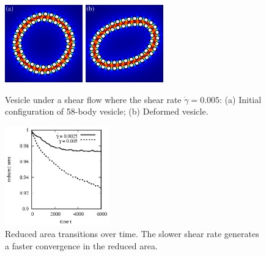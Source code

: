 \documentclass[lineno]{jfm}
\begin{document}
\begin{figure}[H]
\begin{center}
\includegraphics[width=0.3\textwidth]{N58_0.eps}
\includegraphics[width=0.3\textwidth]{N58_20000.eps}
\end{center}
  \caption{Vesicle under a shear flow where the shear rate $\dot\gamma=0.005$: 
  (a) Initial configuration of 58-body vesicle; (b) Deformed vesicle.
  }
    \label{figure2}
\end{figure}





\begin{figure}[H]
\begin{center}
\includegraphics[width=0.4\textwidth]{ReducedArea.eps}
\end{center} 
  \caption{Reduced area transitions over time. The slower shear rate generates a faster convergence in the reduced area. 
  }
    \label{figure3}
\end{figure}
\end{document}
